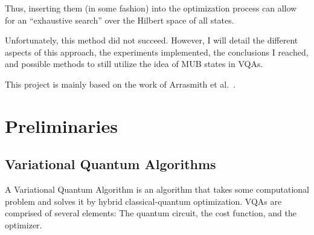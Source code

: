 \documentclass[a4paper,12pt]{article}
\begin{document}
Thus, inserting them (in some fashion) into the optimization process can allow for an ``exhaustive search'' over the Hilbert space of all states.

Unfortunately, this method did not succeed. However, I will detail the different aspects of this approach, the experiments implemented, the conclusions I reached, and possible methods to still utilize the idea of MUB states in VQAs.

This project is mainly based on the work of Arrasmith et al.~\cite{arrasmith_effect_2021}.


\section{Preliminaries}

\subsection{Variational Quantum Algorithms}
A Variational Quantum Algorithm is an algorithm that takes some computational problem and solves it by hybrid classical-quantum optimization.
VQAs are comprised of several elements: The quantum circuit, the cost function, and the optimizer.
\end{document}
